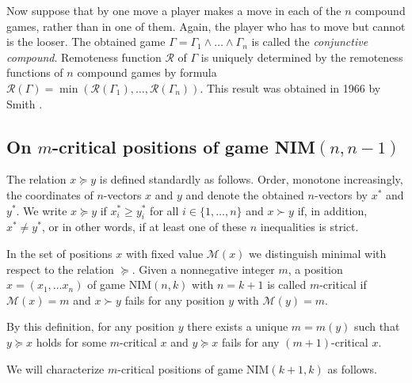 \documentclass{article}
\theoremstyle{definition}
\def\R{\mathcal{R}}
\def\M{\mathcal{M}}
\begin{document}
Now suppose that   
by one move a player makes a move 
in each of the $n$ compound games, 
rather than in one of them. 
Again, the player who has to move but cannot is the looser.
The obtained game  
$\Gamma = \Gamma_1 \wedge \dots \wedge \Gamma_n$  
is called the {\em conjunctive compound}. 
Remoteness function $\R$ of $\Gamma$ is uniquely determined 
by the remoteness functions of $n$ compound games by formula 
$\R(\Gamma) = \min(\R(\Gamma_1), \dots, \R(\Gamma_n))$. 
This result was obtained in 1966 by Smith \cite{Smi66}. 

\subsection{On \boldmath $m$-critical positions of game NIM$(n,n-1)$}
\label{ss04}

The relation  $x \succeq y$  is defined standardly as follows. 
Order, monotone increasingly, the coordinates of 
$n$-vectors $x$ and $y$  and denote the obtained 
$n$-vectors by $x^*$ and $y^*$. 
We write $x \succeq y$  if 
$x^*_i \geq  y^*_i$  for all  $i \in \{1, \dots, n\}$ 
and  $x \succ y$  
if, in addition, $x^* \neq y^*$, 
or in other words, 
if at least one of these 
$n$ inequalities is strict. 

In the set of positions $x$ with fixed value $\M(x)$ 
we distinguish minimal with respect 
to the relation $\succeq$. 
Given a nonnegative integer  $m$,    a position $x = (x_1, \dots x_n)$  
of game NIM$(n,k)$  with $n = k+1$  is called  $m$-critical if  $\M(x) = m$  and  $x \succ y$ fails for any position $y$  with  $\M(y) = m$. 

By this definition, for any position $y$   
there exists a unique $m = m(y)$  
such that  $y \succeq x$  holds 
for some $m$-critical $x$  and   
$y \succeq x$  fails for 
any $(m+1)$-critical  $x$.

\smallskip 

We will characterize  $m$-critical positions 
of game  NIM$(k+1,k)$  %
as follows. 
\end{document}
